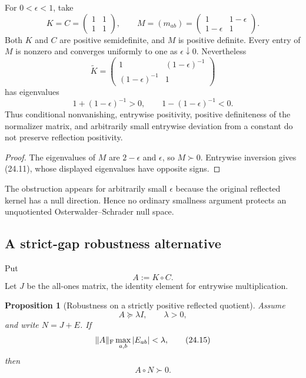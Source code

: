 \documentclass[11pt]{article}
\newtheorem{proposition}[theorem]{Proposition}
\theoremstyle{remark}
\begin{document}
\begin{counterexample}
\label{cth:v12v24-small}
For \(0<\epsilon<1\), take
\[
 K=C=
 \begin{pmatrix}1&1\\1&1\end{pmatrix},
 \qquad
 M=(m_{ab})=
 \begin{pmatrix}1&1-\epsilon\\1-\epsilon&1\end{pmatrix}.
                                                               \tag{24.10}
\]
Both \(K\) and \(C\) are positive semidefinite, and \(M\) is positive
definite.  Every entry of \(M\) is nonzero and converges uniformly to
one as \(\epsilon\downarrow0\).  Nevertheless
\[
 \widetilde K=
 \begin{pmatrix}
 1&(1-\epsilon)^{-1}\\
 (1-\epsilon)^{-1}&1
 \end{pmatrix}                                               \tag{24.11}
\]
has eigenvalues
\[
                         1+(1-\epsilon)^{-1}>0,\qquad
                         1-(1-\epsilon)^{-1}<0.              \tag{24.12}
\]
Thus conditional nonvanishing, entrywise positivity, positive
definiteness of the normalizer matrix, and arbitrarily small
entrywise deviation from a constant do not preserve reflection
positivity.
\end{counterexample}

\begin{proof}
The eigenvalues of \(M\) are \(2-\epsilon\) and \(\epsilon\), so
\(M\succ0\).  Entrywise inversion gives (24.11), whose displayed
eigenvalues have opposite signs.
\end{proof}

The obstruction appears for arbitrarily small \(\epsilon\) because
the original reflected kernel has a null direction.  Hence no
ordinary smallness argument protects an unquotiented
Osterwalder--Schrader null space.

\subsection{A strict-gap robustness alternative}

Put
\[
                         A:=K\circ C.                       \tag{24.13}
\]
Let \(J\) be the all-ones matrix, the identity element for entrywise
multiplication.

\begin{proposition}[Robustness on a strictly positive reflected
quotient]
\label{prop:v12v24-gap}
Assume
\[
                         A\succeq\lambda I,\qquad\lambda>0, \tag{24.14}
\]
and write \(N=J+E\).  If
\[
                         \|A\|_{\rm F}
 \max_{a,b}|E_{ab}|<\lambda,                               \tag{24.15}
\]
then
\[
                         A\circ N\succ0.                    \tag{24.16}
\]
\end{proposition}
\end{document}
